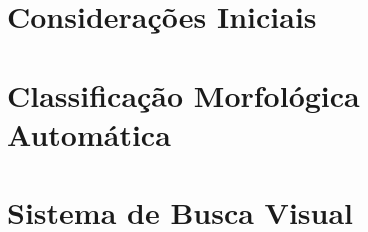 \documentclass[
	12pt,				%
	openright,			%
	twoside,			%
	a4paper,			%
  sumario=tradicional,
	english,			%
	french,				%
	spanish,			%
	brazil				%
	]{abntex2}
\begin{document}
\begingroup
\hypersetup{linkcolor=black}
\tableofcontents*
\cleardoublepage
\endgroup


\textual

\part{Considerações Iniciais}



\part{Classificação Morfológica Automática}


\part{Sistema de Busca Visual}






\postextual



%
%




\end{document}
